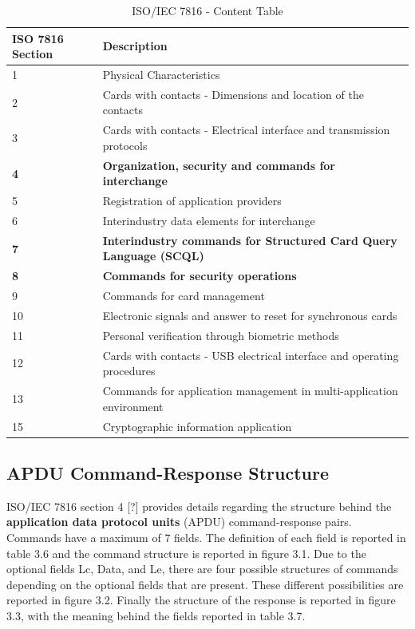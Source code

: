 \documentclass[bsc,frontabs,twoside,singlespacing,parskip,deptreport]{infthesis}     %
\begin{document}
\begin{table}[H]
\begin{tabular}{|l|p{12cm}|}
\hline
ISO 7816 Section & Description\\
\hline
1 & Physical Characteristics \\
\hline
2 & Cards with contacts - Dimensions and location of the contacts \\
\hline
3 & Cards with contacts - Electrical interface and transmission protocols \\
\hline
\textbf{4}  & \textbf{Organization, security and commands for interchange} \\
\hline
5 & Registration of application providers \\
\hline
6 & Interindustry data elements for interchange \\
\hline
\textbf{7} & \textbf{Interindustry commands for Structured Card Query Language (SCQL)} \\
\hline
\textbf{8} & \textbf{Commands for security operations} \\
\hline
9 & Commands for card management \\
\hline
10 & Electronic signals and answer to reset for synchronous cards \\
\hline
11 & Personal verification through biometric methods \\
\hline
12 & Cards with contacts - USB electrical interface and operating procedures \\
\hline
13 & Commands for application management in multi-application environment \\
\hline
15 & Cryptographic information application \\
\hline
\end{tabular}
\caption{ISO/IEC 7816 - Content Table}
\end{table}


\subsection{APDU Command-Response Structure}

ISO/IEC 7816 section 4 [?] provides details regarding the structure behind the \textbf{application data protocol units} (APDU) command-response pairs. Commands have a maximum of 7 fields. The definition of each field is reported in table 3.6 and the command structure is reported in figure 3.1. Due to the optional fields Lc, Data, and Le, there are four possible structures of commands depending on the optional fields that are present. These different possibilities are reported in figure 3.2. Finally the structure of the response is reported in figure 3.3, with the meaning behind the fields reported in table 3.7.
\end{document}
